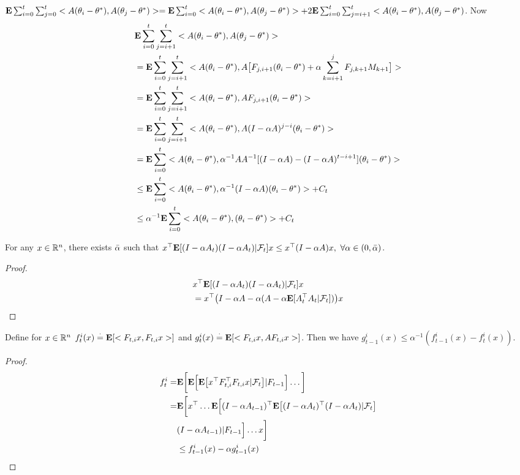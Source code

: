$\mathbf{E}\sum_{i=0}^t\sum_{j=0}^t<A(\theta_i-\theta^*),A(\theta_j-\theta^*)>=\mathbf{E}\sum_{i=0}^t<A(\theta_i-\theta^*),A(\theta_j-\theta^*)>+ 2\mathbf{E}\sum_{i=0}^t\sum_{j=i+1}^t<A(\theta_i-\theta^*),A(\theta_j-\theta^*)$. Now
\begin{align}\label{inter}
&\mathbf{E}\sum_{i=0}^t\sum_{j=i+1}^t<A(\theta_i-\theta^*),A(\theta_j-\theta^*)>\nonumber\\
&=\mathbf{E}\sum_{i=0}^t\sum_{j=i+1}^t<A(\theta_i-\theta^*),A\big[F_{j,i+1} (\theta_i-\theta^*)+\alpha\sum_{k=i+1}^j F_{j,k+1}M_{k+1}\big]>\nonumber\\
&=\mathbf{E}\sum_{i=0}^t\sum_{j=i+1}^t<A(\theta_i-\theta^*),A F_{j,i+1} (\theta_i-\theta^*)>\nonumber\\
&=\mathbf{E}\sum_{i=0}^t\sum_{j=i+1}^t<A(\theta_i-\theta^*),A(I-\alpha A)^{j-i} (\theta_i-\theta^*)>\nonumber\\
&=\mathbf{E}\sum_{i=0}^t<A(\theta_i-\theta^*),\alpha^{-1}AA^{-1}[(I-\alpha A)-(I-\alpha A)^{t-i+1}] (\theta_i-\theta^*)>\nonumber\\
&\leq\mathbf{E}\sum_{i=0}^t <A(\theta_i-\theta^*),\alpha^{-1}(I-\alpha A)(\theta_i-\theta^*)>+C_t\nonumber\\
&\leq\alpha^{-1}\mathbf{E}\sum_{i=0}^t<A(\theta_i-\theta^*),(\theta_i-\theta^*)>+ C_t
\end{align}
\begin{lemma}
For any $x\in \mathbb{R}^n$, there exists $\bar{\alpha}$ such that $x^\top \mathbf{E}[(I-\alpha A_t)(I-\alpha A_t)|\mathcal{F}_t]x \leq x^\top(I-\alpha A)x, ~\forall \alpha\in (0,\bar{\alpha})$.
\end{lemma}
\begin{proof}
\begin{align*}
&x^\top\mathbf{E}[(I-\alpha A_t)(I-\alpha A_t)|\mathcal{F}_t]x\\
&=x^\top\big(I-\alpha A -\alpha( A- \alpha\mathbf{E}[A_t^\top A_t|\mathcal{F}_t])\big)x\\
\end{align*}
\end{proof}
\begin{lemma}
Define for $x\in \mathbb{R}^n$ $f^i_t(x)\stackrel{\cdot}{=}\mathbf{E}[<F_{t,i}x,F_{t,i}x>]$ and $g^i_t(x)\stackrel{\cdot}{=}\mathbf{E}[<F_{t,i}x, A F_{t,i}x>]$. Then we have $g^i_{t-1}(x)\leq \alpha^{-1}(f^i_{t-1}(x)-f^i_t(x))$.
\end{lemma}
\begin{proof}
\begin{align*}
f^i_t=&\mathbf{E}\bigg[\mathbf{E}\Big[\mathbf{E}\big[ x^\top F^\top_{t,i} F_{t,i}x|\mathcal{F}_{t}\big]|F_{t-1}\Big]\ldots\bigg]\\
=&\mathbf{E}\bigg[x^\top\ldots\mathbf{E}\Big[(I-\alpha A_{t-1})^\top\mathbf{E}\big[ (I-\alpha A_t)^\top(I-\alpha A_t)|\mathcal{F}_{t}\big]\\&(I-\alpha A_{t-1})|F_{t-1}\Big]\ldots x\bigg]\\
&\leq f^i_{t-1}(x)-\alpha g^i_{t-1}(x)
\end{align*}
\end{proof}

